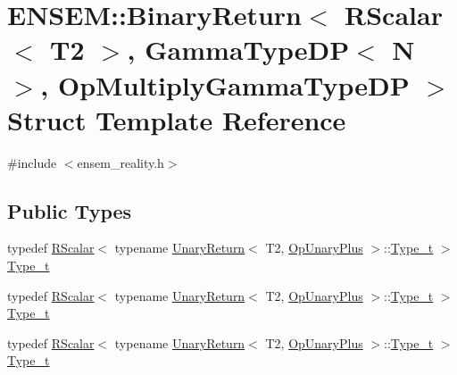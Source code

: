 \hypertarget{structENSEM_1_1BinaryReturn_3_01RScalar_3_01T2_01_4_00_01GammaTypeDP_3_01N_01_4_00_01OpMultiplyGammaTypeDP_01_4}{}\section{E\+N\+S\+EM\+:\+:Binary\+Return$<$ R\+Scalar$<$ T2 $>$, Gamma\+Type\+DP$<$ N $>$, Op\+Multiply\+Gamma\+Type\+DP $>$ Struct Template Reference}
\label{structENSEM_1_1BinaryReturn_3_01RScalar_3_01T2_01_4_00_01GammaTypeDP_3_01N_01_4_00_01OpMultiplyGammaTypeDP_01_4}


{\ttfamily \#include $<$ensem\+\_\+reality.\+h$>$}

\subsection*{Public Types}
\begin{DoxyCompactItemize}
\item 
typedef \mbox{\hyperlink{classENSEM_1_1RScalar}{R\+Scalar}}$<$ typename \mbox{\hyperlink{structENSEM_1_1UnaryReturn}{Unary\+Return}}$<$ T2, \mbox{\hyperlink{structENSEM_1_1OpUnaryPlus}{Op\+Unary\+Plus}} $>$\+::\mbox{\hyperlink{structENSEM_1_1BinaryReturn_3_01RScalar_3_01T2_01_4_00_01GammaTypeDP_3_01N_01_4_00_01OpMultiplyGammaTypeDP_01_4_adb37425bc694707a47d331752227a361}{Type\+\_\+t}} $>$ \mbox{\hyperlink{structENSEM_1_1BinaryReturn_3_01RScalar_3_01T2_01_4_00_01GammaTypeDP_3_01N_01_4_00_01OpMultiplyGammaTypeDP_01_4_adb37425bc694707a47d331752227a361}{Type\+\_\+t}}
\item 
typedef \mbox{\hyperlink{classENSEM_1_1RScalar}{R\+Scalar}}$<$ typename \mbox{\hyperlink{structENSEM_1_1UnaryReturn}{Unary\+Return}}$<$ T2, \mbox{\hyperlink{structENSEM_1_1OpUnaryPlus}{Op\+Unary\+Plus}} $>$\+::\mbox{\hyperlink{structENSEM_1_1BinaryReturn_3_01RScalar_3_01T2_01_4_00_01GammaTypeDP_3_01N_01_4_00_01OpMultiplyGammaTypeDP_01_4_adb37425bc694707a47d331752227a361}{Type\+\_\+t}} $>$ \mbox{\hyperlink{structENSEM_1_1BinaryReturn_3_01RScalar_3_01T2_01_4_00_01GammaTypeDP_3_01N_01_4_00_01OpMultiplyGammaTypeDP_01_4_adb37425bc694707a47d331752227a361}{Type\+\_\+t}}
\item 
typedef \mbox{\hyperlink{classENSEM_1_1RScalar}{R\+Scalar}}$<$ typename \mbox{\hyperlink{structENSEM_1_1UnaryReturn}{Unary\+Return}}$<$ T2, \mbox{\hyperlink{structENSEM_1_1OpUnaryPlus}{Op\+Unary\+Plus}} $>$\+::\mbox{\hyperlink{structENSEM_1_1BinaryReturn_3_01RScalar_3_01T2_01_4_00_01GammaTypeDP_3_01N_01_4_00_01OpMultiplyGammaTypeDP_01_4_adb37425bc694707a47d331752227a361}{Type\+\_\+t}} $>$ \mbox{\hyperlink{structENSEM_1_1BinaryReturn_3_01RScalar_3_01T2_01_4_00_01GammaTypeDP_3_01N_01_4_00_01OpMultiplyGammaTypeDP_01_4_adb37425bc694707a47d331752227a361}{Type\+\_\+t}}
\end{DoxyCompactItemize}


